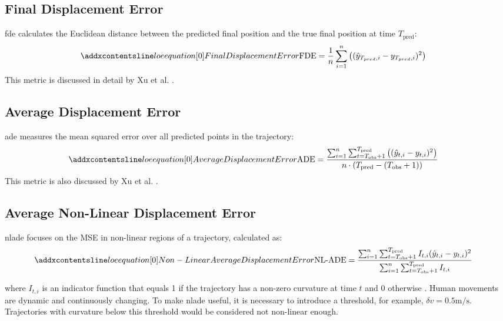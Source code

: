 \subsection{Final Displacement Error}
\label{eq:FDE}
\gls{fde} calculates the Euclidean distance between the predicted final position and the true final position at time \(T_{\text{pred}}\):
\begin{align}
\setequationentry{Final Displacement Error}
    \text{FDE} &= \frac{1}{n}\sum_{i=1}^n \left( (\hat{y}_{T_{pred},i} - y_{T_{pred},i})^2 \right)
\end{align}
This metric is discussed in detail by Xu et al. \cite{xu2018collision}.

\subsection{Average Displacement Error}
\label{eq:ADE}
\gls{ade} measures the mean squared error over all predicted points in the trajectory:
\begin{align}
\setequationentry{Average Displacement Error}
    \text{ADE} &= \frac{\sum_{i=1}^n \sum_{t=T_{\text{obs}}+1}^{T_{\text{pred}}} \left( (\hat{y}_{t,i} - y_{t,i})^2 \right)}{n \cdot (T_{\text{pred}} - (T_{\text{obs}} + 1))}
\end{align}
This metric is also discussed by Xu et al. \cite{xu2018collision}.

\subsection{Average Non-Linear Displacement Error}
\label{eq:nl-ade}
\gls{nlade} focuses on the MSE in non-linear regions of a trajectory, calculated as:
\begin{align}
\setequationentry{Non-Linear Average Displacement Error}
    \text{NL-ADE} &= \frac{\sum_{i=1}^n \sum_{t=T_{\text{obs}}+1}^{T_{\text{pred}}} I_{t,i}  (\hat{y}_{t,i} - y_{t,i})^2}{\sum_{i=1}^n \sum_{t=T_{\text{obs}}+1}^{T_{\text{pred}}} I_{t,i}}
\end{align}

where \(I_{t,i}\) is an indicator function that equals 1 if the trajectory has a non-zero curvature at time \(t\) and 0 otherwise \cite{xu2018collision}. Human movements are dynamic and continuously changing. To make \gls{nlade} useful, it is necessary to introduce a threshold, for example, \(\delta v = 0.5 \text{m/s}\). Trajectories with curvature below this threshold would be considered not non-linear enough.

